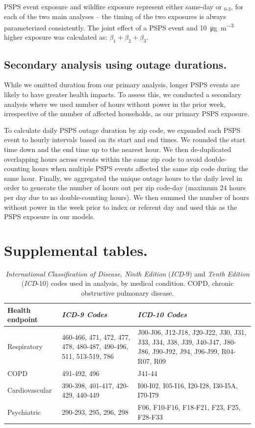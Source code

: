 \documentclass[../main.tex]{subfiles}
\begin{document}
\vspace{1em}

PSPS event exposure and wildfire \PM exposure represent either same-day or $_{0\text{-}3}$, for each of the two main analyses -- the timing of the two exposures is always parameterized consistently. The joint effect of a PSPS event and \SI[per-mode=symbol]{10}{\micro\gram\per\cubic\metre} higher \PM exposure was calculated as: $\beta_1 + \beta_2 + \beta_3$. 

\subsection{Secondary analysis using outage durations.}
While we omitted duration from our primary analysis, longer PSPS events are likely to have greater health impacts. To assess this, we conducted a secondary analysis where we used number of hours without power in the prior week, irrespective of the number of affected households, as our primary PSPS exposure.

To calculate daily PSPS outage duration by zip code, we expanded each PSPS event to hourly intervals based on its start and end times. We rounded the start time down and the end time up to the nearest hour. We then de-duplicated overlapping hours across events within the same zip code to avoid double-counting hours when multiple PSPS events affected the same zip code during the same hour. Finally, we aggregated the unique outage hours to the daily level in order to generate the number of hours out per zip code-day (maximum 24 hours per day due to no double-counting hours). We then summed the number of hours without power in the week prior to index or referent day and used this as the PSPS exposure in our models.


\pagebreak
\section{Supplemental tables.}
\begin{table}[h]
\centering
\begin{tabular}{|p{}|p{}|p{}|}
\hline
\textbf{Health endpoint} & \textbf{\textit{ICD-9 Codes}} & \textbf{\textit{ICD-10 Codes}} \\
\hline
Respiratory & 460-466, 471, 472, 477, 478, 480-487, 490-496, 511, 513-519, 786 & J00-J06, J12-J18, J20-J22, J30, J31, J33, J34, J38, J39, J40-J47, J80-J86, J90-J92, J94, J96-J99, R04-R07, R09 \\
\hline
COPD & 491-492, 496 & J41-44 \\
\hline
Cardiovascular & 390-398, 401-417, 420-429, 440-449 & I00-I02, I05-I16, I20-I28, I30-I5A, I70-I79 \\
\hline
Psychiatric & 290-293, 295, 296, 298 & F06, F10-F16, F18-F21, F23, F25, F28-F33 \\
\hline
\end{tabular}
\caption{\textit{International Classification of Disease, Ninth Edition} (\textit{ICD}-9) and \textit{Tenth Edition} (\textit{ICD}-10) codes used in analysis, by medical condition. COPD, chronic obstructive pulmonary disease.} 
\label{tab:icd_codes}
\end{table}
\end{document}
